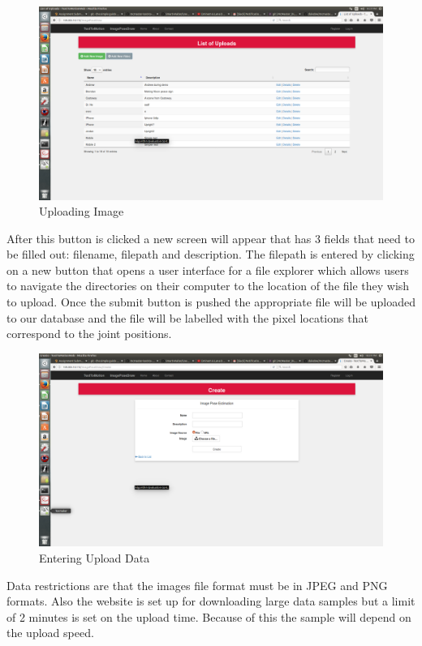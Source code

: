 \documentclass{scrreprt}
\begin{document}
\begin{figure}
  \includegraphics[width=\linewidth]{uploadPage.png}
  \caption{Uploading Image}
  \label{fig:uploadPage}
\end{figure}

After this button is clicked a new screen will appear that has 3 fields that
need to be filled out: filename, filepath and description.  The filepath is
entered by clicking on a new button that opens a user interface for a file
explorer which allows users to navigate the directories on their computer to
the location of the file they wish to upload.  Once the submit button is pushed
the appropriate file will be uploaded to our database and the file will be
labelled with the pixel locations that correspond to the joint positions.

\begin{figure}
  \includegraphics[width=\linewidth]{greenButtonPage.png}
  \caption{Entering Upload Data}
  \label{fig:uploadPage}
\end{figure}

Data restrictions are that the images file format must be in JPEG and PNG
formats.  Also the website is set up for downloading large data samples but a
limit of 2 minutes is set on the upload time.  Because of this the sample will
depend on the upload speed.
\end{document}
